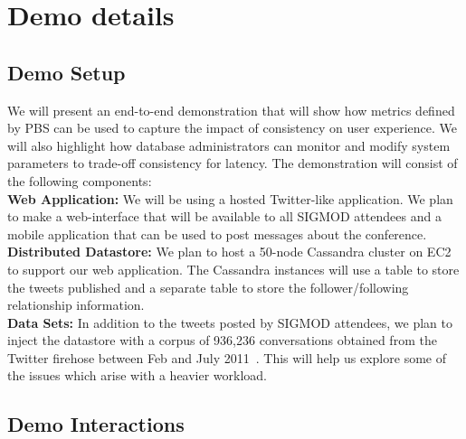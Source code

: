 \section{Demo details}
\label{sec:demo}


\subsection{Demo Setup}
We will present an end-to-end demonstration that will show how metrics defined
by PBS can be used to capture the impact of consistency on user experience. We
will also highlight how database administrators can monitor and modify system
parameters to trade-off consistency for latency. The demonstration will consist
of the following components:\\


\textbf{Web Application:} We will be using a hosted Twitter-like application. We
plan to make a web-interface that will be available to all SIGMOD attendees and
a mobile application that can be used to post messages about the conference.\\

\textbf{Distributed Datastore:} We plan to host a 50-node Cassandra cluster on
EC2 to support our web application. The Cassandra instances will use a table to
store the tweets published and a separate table to store the follower/following
relationship information.\\

\textbf{Data Sets:} In addition to the tweets posted by SIGMOD attendees, we
plan to inject the datastore with a corpus of 936,236 conversations obtained
from the Twitter firehose between Feb and July 2011~\cite{ritter2010unsupervised}. 
This will help us explore some of the issues which arise with a heavier workload.

\subsection{Demo Interactions}


